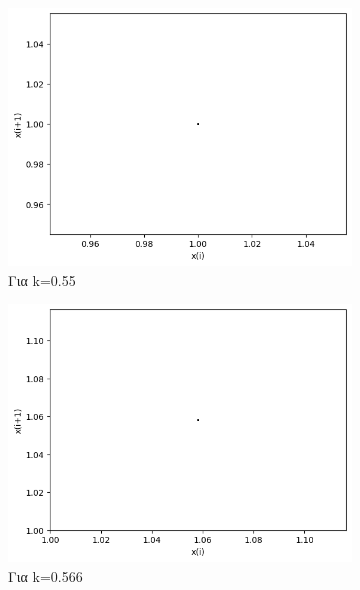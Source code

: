 \begin{figure}[h!]
	\centering
	\caption{Διαγράμματα της τιμής \(x_i\) με την τιμή \(x_{i+1}\) :}
	\begin{subfigure}[b]{0.25\textwidth}
		\centering
		\includegraphics[width=\textwidth]{LateX images/graphs q12/g3}
		\caption{Για k=0.55}
		\label{f:k59}
	\end{subfigure}
	\hfill
	\begin{subfigure}[b]{0.25\textwidth}
		\centering
		\includegraphics[width=\textwidth]{LateX images/graphs q12/g4}
		\caption{Για k=0.566}
		\label{f:k60}
	\end{subfigure}
	\hfill
	\begin{subfigure}[b]{0.25\textwidth}

\end{subfigure}
\end{figure}

